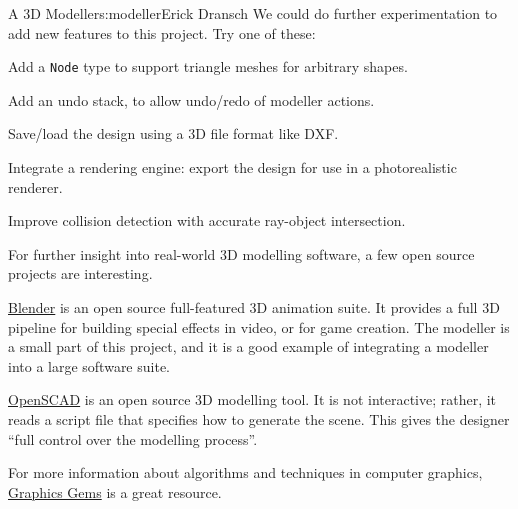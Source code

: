 \begin{aosachapter}{A 3D Modeller}{s:modeller}{Erick Dransch}
We could do further experimentation to add new features to this project.
Try one of these:

\begin{aosaitemize}

\item
  Add a \texttt{Node} type to support triangle meshes for arbitrary
  shapes.
\item
  Add an undo stack, to allow undo/redo of modeller actions.
\item
  Save/load the design using a 3D file format like DXF.
\item
  Integrate a rendering engine: export the design for use in a
  photorealistic renderer.
\item
  Improve collision detection with accurate ray-object intersection.
\end{aosaitemize}

\label{further-exploration}

For further insight into real-world 3D modelling software, a few open
source projects are interesting.

\href{http://www.blender.org/}{Blender} is an open source full-featured
3D animation suite. It provides a full 3D pipeline for building special
effects in video, or for game creation. The modeller is a small part of
this project, and it is a good example of integrating a modeller into a
large software suite.

\href{http://www.openscad.org/}{OpenSCAD} is an open source 3D modelling
tool. It is not interactive; rather, it reads a script file that
specifies how to generate the scene. This gives the designer ``full
control over the modelling process''.

For more information about algorithms and techniques in computer
graphics, \href{http://tog.acm.org/resources/GraphicsGems/}{Graphics
Gems} is a great resource.

\end{aosachapter}
